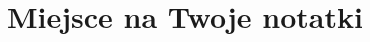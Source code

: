 \documentclass[12pt, a4paper]{article}
\begin{document}
\title{ }
\author{ }
\date {}

\thispagestyle{title}

\section*{Miejsce na Twoje notatki}
\end{document}
